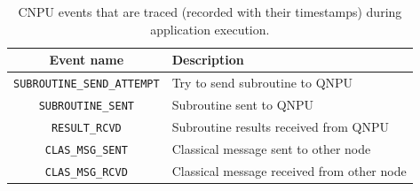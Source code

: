 \clearpage

\begin{table}[htpb]
    \centering
    \begin{tabular}{|c|l|}
    \hline
    \textbf{Event name} & \textbf{Description} \\ 
    \hline
    \texttt{SUBROUTINE\_SEND\_ATTEMPT} & Try to send subroutine to \ac{QNPU} \\
    \texttt{SUBROUTINE\_SENT} & Subroutine sent to \ac{QNPU} \\ 
    \texttt{RESULT\_RCVD} & Subroutine results received from \ac{QNPU} \\
    \texttt{CLAS\_MSG\_SENT} & Classical message sent to other node \\
    \texttt{CLAS\_MSG\_RCVD} & Classical message received from other node \\
    \hline
    \end{tabular}
    \caption{\ac{CNPU} events that are traced (recorded with their timestamps) during application execution.}
    \label{tab:host_events}
\end{table}


